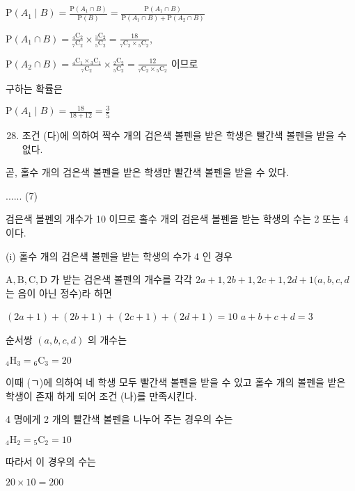 \documentclass[10pt]{article}
\begin{document}
\(\mathrm{P}\left(A_{1} \mid B\right)=\frac{\mathrm{P}\left(A_{1} \cap B\right)}{\mathrm{P}(B)}=\frac{\mathrm{P}\left(A_{1} \cap B\right)}{\mathrm{P}\left(A_{1} \cap B\right)+\mathrm{P}\left(A_{2} \cap B\right)}\)

\(\mathrm{P}\left(A_{1} \cap B\right)=\frac{{ }_{4} \mathrm{C}_{2}}{{ }_{7} \mathrm{C}_{2}} \times \frac{{ }_{3} \mathrm{C}_{2}}{{ }_{5} \mathrm{C}_{2}}=\frac{18}{{ }_{7} \mathrm{C}_{2} \times{ }_{5} \mathrm{C}_{2}}\),

\(\mathrm{P}\left(A_{2} \cap B\right)=\frac{{ }_{4} \mathrm{C}_{1} \times{ }_{3} \mathrm{C}_{1}}{{ }_{7} \mathrm{C}_{2}} \times \frac{{ }_{2} \mathrm{C}_{2}}{{ }_{5} \mathrm{C}_{2}}=\frac{12}{{ }_{7} \mathrm{C}_{2} \times{ }_{5} \mathrm{C}_{2}}\) 이므로

구하는 확률은

\(\mathrm{P}\left(A_{1} \mid B\right)=\frac{18}{18+12}=\frac{3}{5}\)

\begin{enumerate}
  \setcounter{enumi}{27}
  \item 조건 (다)에 의하여 짝수 개의 검은색 볼펜을 받은 학생은 빨간색 볼펜을 받을 수 없다.
\end{enumerate}

곧, 홀수 개의 검은색 볼펜을 받은 학생만 빨간색 볼펜을 받을 수 있다.

...... (7)

검은색 볼펜의 개수가 10 이므로 홀수 개의 검은색 볼펜을 받는 학생의 수는 2 또는 4 이다.

(i) 홀수 개의 검은색 볼펜을 받는 학생의 수가 4 인 경우

\(\mathrm{A}, \mathrm{B}, \mathrm{C}, \mathrm{D}\) 가 받는 검은색 볼펜의 개수를 각각 \(2 a+1,2 b+1,2 c+1,2 d+1(a, b, c, d\) 는 음이 아닌 정수)라 하면

\((2 a+1)+(2 b+1)+(2 c+1)+(2 d+1)=10\) \(a+b+c+d=3\)

순서쌍 \((a, b, c, d)\) 의 개수는

\({ }_{4} \mathrm{H}_{3}={ }_{6} \mathrm{C}_{3}=20\)

이때 (ㄱ)에 의하여 네 학생 모두 빨간색 볼펜을 받을 수 있고 홀수 개의 볼펜을 받은 학생이 존재 하게 되어 조건 (나)를 만족시킨다.

4 명에게 2 개의 빨간색 볼펜을 나누어 주는 경우의 수는

\({ }_{4} \mathrm{H}_{2}={ }_{5} \mathrm{C}_{2}=10\)

따라서 이 경우의 수는

\(20 \times 10=200\)
\end{document}
